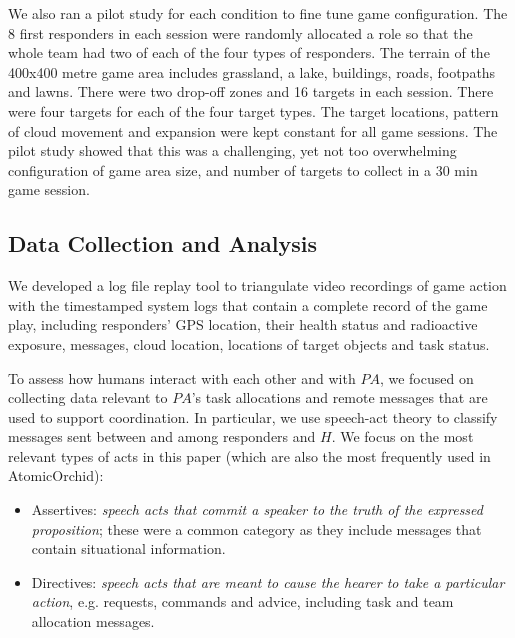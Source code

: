 We also ran a pilot study for each condition to fine tune game configuration. The 8 first responders in each session were randomly allocated a role so that the whole team had two of each of the four types of responders. The terrain of the 400x400 metre  game area includes grassland, a lake, buildings, roads,  footpaths and lawns. There were two  drop-off zones and 16 targets in each session. There were four targets for each of the four target types. The target locations, pattern of cloud movement and expansion were kept constant for all game sessions. The pilot study showed that this was a challenging, yet not too overwhelming configuration of game area size, and number of targets to collect in a 30 min game session. 

\subsection{Data Collection and Analysis}
\noindent We developed a log file replay tool to triangulate video recordings of game action with the timestamped system logs that contain a complete record of the game play, including responders' GPS location, their health status and radioactive exposure, messages, cloud location, locations of target objects and task status.


To assess how humans interact with each other and with $PA$, we focused on collecting data relevant to $PA$'s task allocations and remote messages  that are used to support coordination. In particular, we use speech-act theory \cite{searle:1975} to classify messages sent between and among responders and $H$. We focus on the most relevant types of acts in this paper (which are also the most frequently used in AtomicOrchid):

\begin{itemize}
\item Assertives: \textit{speech acts that commit a speaker to the truth of the expressed proposition}; these were a common category as they include messages that contain situational information.
\item Directives: \textit{speech acts that are meant to cause the hearer to take a particular action}, e.g. requests, commands and advice, including task and team allocation messages. 
\end{itemize}

